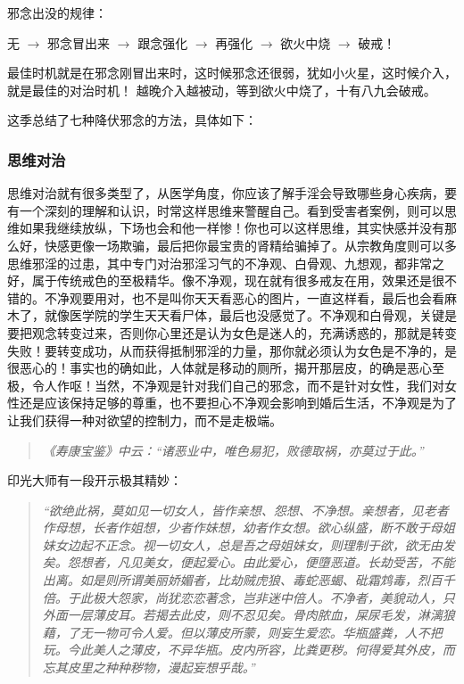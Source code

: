 邪念出没的规律：

\begin{center}
    无 $\to$ 邪念冒出来 $\to$ 跟念强化 $\to$ 再强化 $\to$ 欲火中烧 $\to$ 破戒！
\end{center}

最佳时机就是在邪念刚冒出来时，这时候邪念还很弱，犹如小火星，这时候介入，就是最佳的对治时机！
越晚介入越被动，等到欲火中烧了，十有八九会破戒。

这季总结了七种降伏邪念的方法，具体如下：

\subsubsection{思维对治}

思维对治就有很多类型了，从医学角度，你应该了解手淫会导致哪些身心疾病，要有一个深刻的理解和认识，时常这样思维来警醒自己。看到受害者案例，则可以思维如果我继续放纵，下场也会和他一样惨！你也可以这样思维，其实快感并没有那么好，快感更像一场欺骗，最后把你最宝贵的肾精给骗掉了。从宗教角度则可以多思维邪淫的过患，其中专门对治邪淫习气的不净观、白骨观、九想观，都非常之好，属于传统戒色的至极精华。像不净观，现在就有很多戒友在用，效果还是很不错的。不净观要用对，也不是叫你天天看恶心的图片，一直这样看，最后也会看麻木了，就像医学院的学生天天看尸体，最后也没感觉了。不净观和白骨观，关键是要把观念转变过来，否则你心里还是认为女色是迷人的，充满诱惑的，那就是转变失败！要转变成功，从而获得抵制邪淫的力量，那你就必须认为女色是不净的，是很恶心的！事实也的确如此，人体就是移动的厕所，揭开那层皮，的确是恶心至极，令人作呕！当然，不净观是针对我们自己的邪念，而不是针对女性，我们对女性还是应该保持足够的尊重，也不要担心不净观会影响到婚后生活，不净观是为了让我们获得一种对欲望的控制力，而不是走极端。

\begin{quote}\it
    《寿康宝鉴》中云：“诸恶业中，唯色易犯，败德取祸，亦莫过于此。”
\end{quote}

印光大师有一段开示极其精妙：

\begin{quote}\it
    “欲绝此祸，莫如见一切女人，皆作亲想、怨想、不净想。亲想者，见老者作母想，长者作姐想，少者作妹想，幼者作女想。欲心纵盛，断不敢于母姐妹女边起不正念。视一切女人，总是吾之母姐妹女，则理制于欲，欲无由发矣。怨想者，凡见美女，便起爱心。由此爱心，便墮恶道。长劫受苦，不能出离。如是则所谓美丽娇媚者，比劫贼虎狼、毒蛇恶蝎、砒霜鸩毒，烈百千倍。于此极大怨家，尚犹恋恋著念，岂非迷中倍人。不净者，美貌动人，只外面一层薄皮耳。若揭去此皮，则不忍见矣。骨肉脓血，屎尿毛发，淋漓狼藉，了无一物可令人爱。但以薄皮所蒙，则妄生爱恋。华瓶盛粪，人不把玩。今此美人之薄皮，不异华瓶。皮内所容，比粪更秽。何得爱其外皮，而忘其皮里之种种秽物，漫起妄想乎哉。”
\end{quote}

